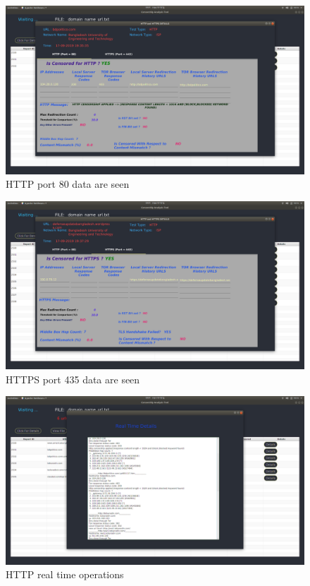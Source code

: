 \begin{figure}[h]
    \centering
    \includegraphics[width=\textwidth]{usersite/32httpdetails.png}
    \caption{HTTP port 80 data are seen}
    \label{fig:user32}
\end{figure}



\begin{figure}[h]
    \centering
    \includegraphics[width=\textwidth]{usersite/34httpsrealtime.png}
    \caption{HTTPS port 435 data are seen}
    \label{fig:user34}
\end{figure}

\begin{figure}[h]
    \centering
    \includegraphics[width=\textwidth]{usersite/33httprealtime.png}
    \caption{HTTP real time operations}
    \label{fig:user33}
\end{figure}

